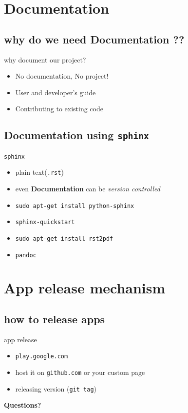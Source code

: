 \documentclass{beamer}
\begin{document}
 \section{Documentation}
 \subsection{why do we need Documentation ??}
 \begin{frame}{why document our project?}
     \begin{itemize}
     \item No documentation, No project!
     \item User and developer's guide
     \item Contributing to existing code 
     \end{itemize}
 \end{frame}

 \subsection{Documentation using {\tt sphinx}}
 \begin{frame}{{\tt sphinx}}
   \begin{itemize}
   \item plain text({\tt .rst})
   \item even {\bf Documentation} can be {\em version controlled}
   \end{itemize}
   \begin{block}{}
     \begin{itemize}
     \item {\tt sudo apt-get install python-sphinx}
     \item {\tt sphinx-quickstart} \pause
     \item {\tt sudo apt-get install rst2pdf}
     \item {\tt pandoc}
     \end{itemize} \pause
   \end{block}
 \end{frame}

\section{App release mechanism}
\subsection{how to release apps}
\begin{frame}{app release}
    \begin{itemize}
    \item {\tt play.google.com}
    \item host it on {\tt github.com} or your custom page
    \item releasing version ({\tt git tag})
    \end{itemize}
\end{frame}

\begin{frame}{}
  \centerline{\bf Questions?}
\end{frame}
\end{document}
